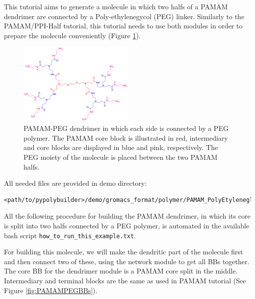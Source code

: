 
This tutorial aims to generate a molecule in which two halfs of a PAMAM dendrimer are connected by a Poly-ethylenegycol (PEG) linker.
Similarly to the PAMAM/PPI-Half tutorial, this tutorial needs to use both modules in order to prepare the molecule conveniently (Figure \ref{fig:PAMAMPEG}).

\begin{figure}
    \centering
    \includegraphics[width=0.5\textwidth]{PAMAM_PEG/PAMAMPEG.png}
    \caption{PAMAM-PEG dendrimer in which each side is connected by a PEG polymer. The PAMAM core block is illustrated in red, intermediary and core blocks are displayed in blue and pink, respectively. The PEG moiety of the molecule is placed between the two PAMAM halfs.}
    \label{fig:PAMAMPEG}
\end{figure}

All needed files are provided in demo directory:

\begin{lstlisting}
<path/to/pypolybuilder>/demo/gromacs_format/polymer/PAMAM_PolyEtyleneglycol
\end{lstlisting}

All the following procedure for building the PAMAM dendrimer, in which its core is split into two halfs connected by a PEG polymer, is automated in the available bash script \texttt{how\_to\_run\_this\_example.txt}.

For building this molecule, we will make the dendritic part of the molecule first and then connect two of these, using the network module to get all BBs together.
The core BB for the dendrimer module is a PAMAM core split in the middle.
Intermediary and terminal blocks are the same as used in PAMAM tutorial (See Figure \ref{fig:PAMAMPEGBBs}).

